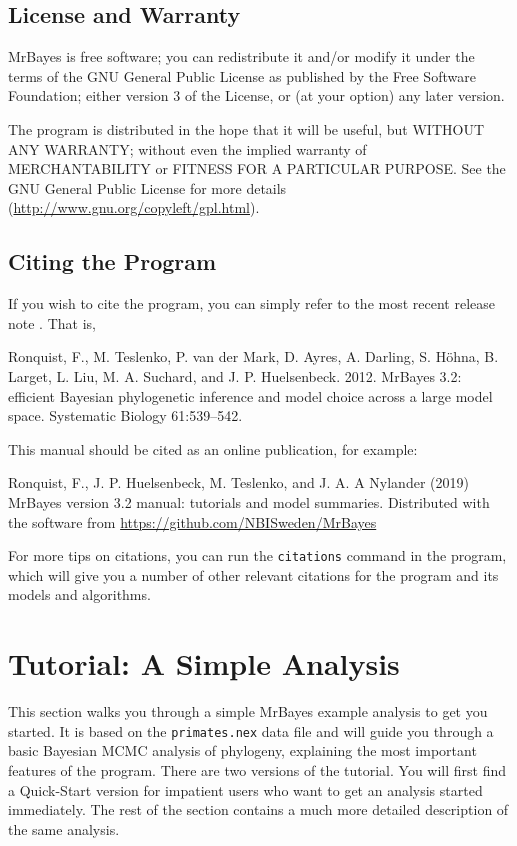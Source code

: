 \documentclass[12pt]{book}
\newcommand{\ttt}[1]{\texttt{#1}}
\begin{document}
\section{License and Warranty}
MrBayes is free software; you can redistribute it and/or modify it under the terms of the GNU
General Public License as published by the Free Software Foundation; either version 3 of the
License, or (at your option) any later version.

The program is distributed in the hope that it will be useful, but WITHOUT ANY WARRANTY; without
even the implied warranty of MERCHANTABILITY or FITNESS FOR A PARTICULAR PURPOSE. See the GNU
General Public License for more details (\url{http://www.gnu.org/copyleft/gpl.html}).

\section{Citing the Program}
If you wish to cite the program, you can simply refer to the most recent release note
\citep{ronquist12b}. That is,

\begin{singlespacing}
\footnotesize
Ronquist, F., M. Teslenko, P. van der Mark, D. Ayres, A. Darling, S. H\"{o}hna,
B. Larget, L. Liu, M. A. Suchard, and J. P. Huelsenbeck. 2012. MrBayes 3.2:
efficient Bayesian phylogenetic inference and model choice across a large model
space. Systematic Biology 61:539--542.
\normalsize
\end{singlespacing}

This manual should be cited as an online publication, for example:

\begin{singlespacing}
\footnotesize
Ronquist, F., J. P. Huelsenbeck, M. Teslenko, and J. A. A Nylander (2019) MrBayes version 3.2 manual:
tutorials and model summaries. Distributed with the software from
\url{https://github.com/NBISweden/MrBayes}
\normalsize
\end{singlespacing}

For more tips on citations, you can run the \ttt{citations} command in the program, which will give
you a number of other relevant citations for the program and its models and algorithms.


\chapter{Tutorial: A Simple Analysis}
\label{tutorialSimple}
This section walks you through a simple MrBayes example analysis to get you started. It is based on
the \ttt{primates.nex} data file and will guide you through a basic Bayesian MCMC analysis of
phylogeny, explaining the most important features of the program. There are two versions of the
tutorial. You will first find a Quick-Start version for impatient users who want to get an analysis
started immediately. The rest of the section contains a much more detailed description of the same
analysis.
\end{document}
